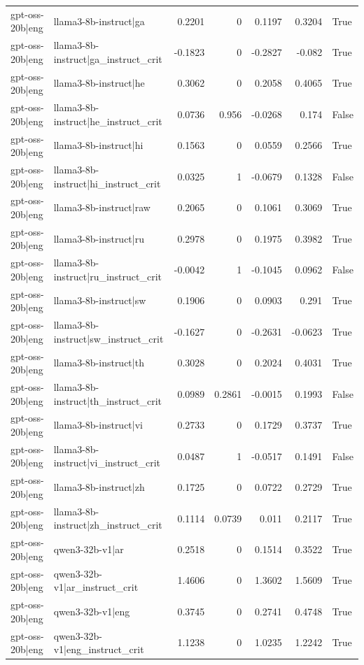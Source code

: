 \begin{table}
\begin{tabular}{l l r r r r l}
gpt-oss-20b|eng & llama3-8b-instruct|ga & 0.2201 & 0 & 0.1197 & 0.3204 & True \\
gpt-oss-20b|eng & llama3-8b-instruct|ga_instruct_crit & -0.1823 & 0 & -0.2827 & -0.082 & True \\
gpt-oss-20b|eng & llama3-8b-instruct|he & 0.3062 & 0 & 0.2058 & 0.4065 & True \\
gpt-oss-20b|eng & llama3-8b-instruct|he_instruct_crit & 0.0736 & 0.956 & -0.0268 & 0.174 & False \\
gpt-oss-20b|eng & llama3-8b-instruct|hi & 0.1563 & 0 & 0.0559 & 0.2566 & True \\
gpt-oss-20b|eng & llama3-8b-instruct|hi_instruct_crit & 0.0325 & 1 & -0.0679 & 0.1328 & False \\
gpt-oss-20b|eng & llama3-8b-instruct|raw & 0.2065 & 0 & 0.1061 & 0.3069 & True \\
gpt-oss-20b|eng & llama3-8b-instruct|ru & 0.2978 & 0 & 0.1975 & 0.3982 & True \\
gpt-oss-20b|eng & llama3-8b-instruct|ru_instruct_crit & -0.0042 & 1 & -0.1045 & 0.0962 & False \\
gpt-oss-20b|eng & llama3-8b-instruct|sw & 0.1906 & 0 & 0.0903 & 0.291 & True \\
gpt-oss-20b|eng & llama3-8b-instruct|sw_instruct_crit & -0.1627 & 0 & -0.2631 & -0.0623 & True \\
gpt-oss-20b|eng & llama3-8b-instruct|th & 0.3028 & 0 & 0.2024 & 0.4031 & True \\
gpt-oss-20b|eng & llama3-8b-instruct|th_instruct_crit & 0.0989 & 0.2861 & -0.0015 & 0.1993 & False \\
gpt-oss-20b|eng & llama3-8b-instruct|vi & 0.2733 & 0 & 0.1729 & 0.3737 & True \\
gpt-oss-20b|eng & llama3-8b-instruct|vi_instruct_crit & 0.0487 & 1 & -0.0517 & 0.1491 & False \\
gpt-oss-20b|eng & llama3-8b-instruct|zh & 0.1725 & 0 & 0.0722 & 0.2729 & True \\
gpt-oss-20b|eng & llama3-8b-instruct|zh_instruct_crit & 0.1114 & 0.0739 & 0.011 & 0.2117 & True \\
gpt-oss-20b|eng & qwen3-32b-v1|ar & 0.2518 & 0 & 0.1514 & 0.3522 & True \\
gpt-oss-20b|eng & qwen3-32b-v1|ar_instruct_crit & 1.4606 & 0 & 1.3602 & 1.5609 & True \\
gpt-oss-20b|eng & qwen3-32b-v1|eng & 0.3745 & 0 & 0.2741 & 0.4748 & True \\
gpt-oss-20b|eng & qwen3-32b-v1|eng_instruct_crit & 1.1238 & 0 & 1.0235 & 1.2242 & True \\

\end{tabular}
\end{table}
